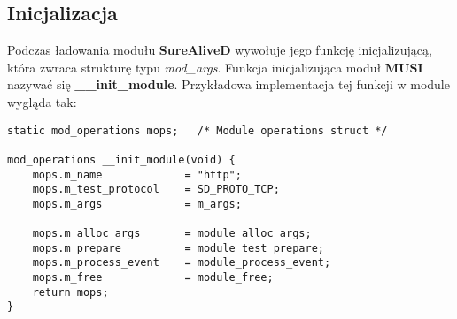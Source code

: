 \documentclass[polish,12pt]{article}
\begin{document}
\subsection{Inicjalizacja}
Podczas ładowania modułu \textbf{SureAliveD} wywołuje jego funkcję inicjalizującą, która zwraca
strukturę typu \textit{mod\_args}. Funkcja inicjalizująca moduł \textbf{MUSI} nazywać się
\textbf{\_\_init\_module}. Przykładowa implementacja tej funkcji w module wygląda tak:
{\small
\begin{verbatim}
static mod_operations mops;   /* Module operations struct */

mod_operations __init_module(void) {
    mops.m_name             = "http";
    mops.m_test_protocol    = SD_PROTO_TCP;
    mops.m_args             = m_args;

    mops.m_alloc_args       = module_alloc_args;
    mops.m_prepare          = module_test_prepare;
    mops.m_process_event    = module_process_event;
    mops.m_free             = module_free;
    return mops;
}
\end{verbatim}
}
\end{document}
